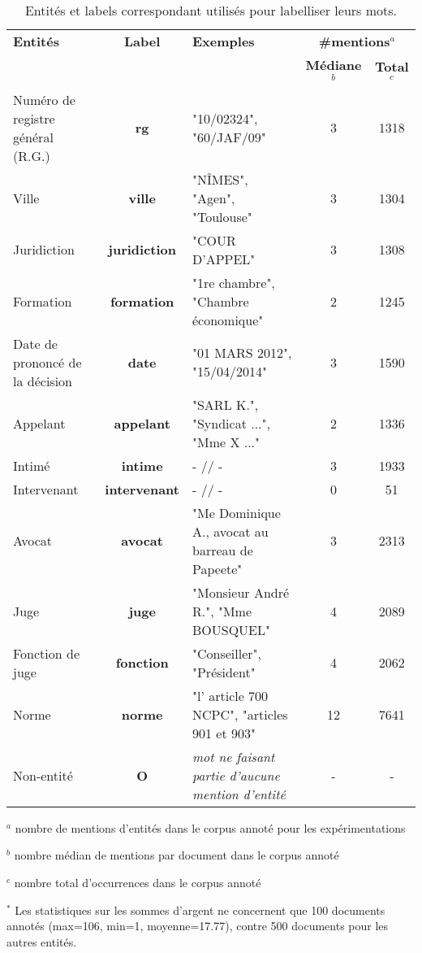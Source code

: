 \begin{table}[!ht]
\scriptsize
\begin{tabular}[c]{|p{}|c|p{}|cc|}
\hline
\textbf{Entités} & \textbf{Label} & \textbf{Exemples} & \multicolumn{2}{c|}{\textbf{\#mentions}$^a$}\\
  & & & \textbf{Médiane}$^b$& \textbf{Total}$^c$ \\ \hline
Numéro de registre général (R.G.) & \textbf{rg} & "10/02324", "60/JAF/09" & 3 & 1318\\ \hline
Ville & \textbf{ville}& "NÎMES", "Agen", "Toulouse" & 3 & 1304\\ \hline
Juridiction & \textbf{juridiction} & "COUR D'APPEL" & 3 & 1308\\ \hline
Formation & \textbf{formation} & "1re chambre", "Chambre économique" & 2 &  1245\\ \hline
Date de prononcé de la décision & \textbf{date} & "01 MARS 2012", "15/04/2014" & 3 & 1590\\ \hline
Appelant & \textbf{appelant} & "SARL K.", "Syndicat ...", "Mme X ..." & 2 & 1336 \\ \hline
Intimé & \textbf{intime} & - // - & 3 & 1933 \\ \hline
Intervenant & \textbf{intervenant} & - // - & 0 & 51 \\ \hline
Avocat & \textbf{avocat} & "Me Dominique A., avocat au barreau de Papeete" & 3 & 2313\\ \hline
Juge & \textbf{juge} & "Monsieur André R.", "Mme BOUSQUEL" & 4 & 2089\\ \hline
Fonction de juge & \textbf{fonction} & "Conseiller", "Président" & 4 & 2062\\ \hline
Norme & \textbf{norme} & "l' article 700 NCPC", "articles 901 et 903" & 12 & 7641 \\ \hline
\noalign{\smallskip}\hline\noalign{\smallskip}
Non-entité & \textbf{O} & \textit{mot ne faisant partie d'aucune mention d'entité} & - & -\\ \hline
\end{tabular} 

$^a$ nombre de mentions d'entités dans le corpus annoté pour les expérimentations

$^b$ nombre médian de mentions par document dans le corpus annoté

$^c$ nombre total d'occurrences dans le corpus annoté

$^*$ Les statistiques sur les sommes d'argent ne concernent que 100 documents annotés (max=106, min=1, moyenne=17.77), contre 500 documents pour les autres entités.
\caption{Entités et labels correspondant utilisés pour labelliser leurs mots. }\label{tab:structuration:relevantinfo}
\end{table}

